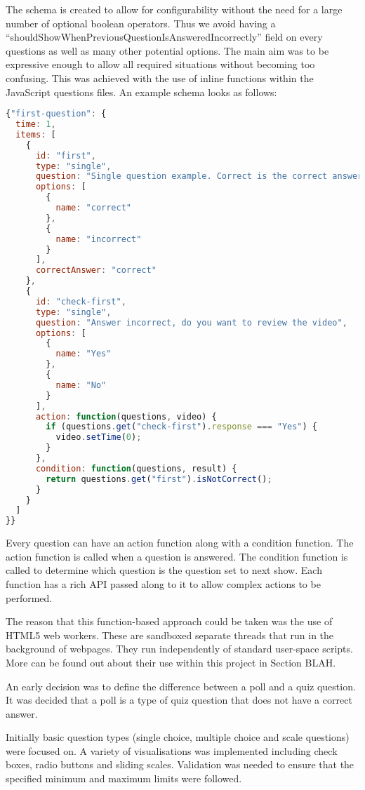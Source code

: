 The schema is created to allow for configurability without the need for a large number of optional boolean operators. Thus we avoid having a ``shouldShowWhenPreviousQuestionIsAnsweredIncorrectly'' field on every questions as well as many other potential options. The main aim was to be expressive enough to allow all required situations without becoming too confusing. This was achieved with the use of inline functions within the JavaScript questions files. An example schema looks as follows:
\begin{lstlisting}[language=javascript]
{"first-question": {
  time: 1,
  items: [
    {
      id: "first",
      type: "single",
      question: "Single question example. Correct is the correct answer",
      options: [
        {
          name: "correct"
        },
        {
          name: "incorrect"
        }
      ],
      correctAnswer: "correct"
    },
    {
      id: "check-first",
      type: "single",
      question: "Answer incorrect, do you want to review the video",
      options: [
        {
          name: "Yes"
        },
        {
          name: "No"
        }
      ],
      action: function(questions, video) {
        if (questions.get("check-first").response === "Yes") {
          video.setTime(0);
        }
      },
      condition: function(questions, result) {
        return questions.get("first").isNotCorrect();
      }
    }
  ]
}}
\end{lstlisting}
Every question can have an action function along with a condition function. The action function is called when a question is answered. The condition function is called to determine which question is the question set to next show. Each function has a rich API passed along to it to allow complex actions to be performed.

The reason that this function-based approach could be taken was the use of HTML5 web workers. These are sandboxed separate threads that run in the background of webpages. They run independently of standard user-space scripts. More can be found out about their use within this project in Section BLAH. 

An early decision was to define the difference between a poll and a quiz question. It was decided that a poll is a type of quiz question that does not have a correct answer.

Initially basic question types (single choice, multiple choice and scale questions) were focused on. A variety of visualisations was implemented including check boxes, radio buttons and sliding scales. Validation was needed to ensure that the specified minimum and maximum limits were followed.

